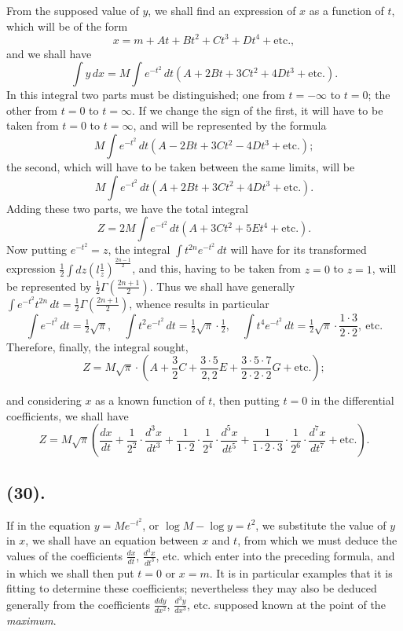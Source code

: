 \documentclass{article}
\begin{document}
From the supposed value of $y$, we shall find an expression of $x$ as a function of $t$, which will be of the form
\[ x=m+At+Bt^{2}+Ct^{3}+Dt^{4}+\text{etc.}, \]
and we shall have
\[ \int y\,dx=M\int e^{-t^{2}}\,dt(A+2Bt+3Ct^{2}+4Dt^{3}+\text{etc.}). \]
In this integral two parts must be distinguished; one from $t=-\infty$ to $t=0$; the other from $t=0$ to $t=\infty$. If we change the sign of the first, it will have to be taken from $t=0$ to $t=\infty$, and will be represented by the formula
\[ M\int e^{-t^{2}}\,dt(A-2Bt+3Ct^{2}-4Dt^{3}+\text{etc.}); \]
the second, which will have to be taken between the same limits, will be
\[ M\int e^{-t^{2}}\,dt(A+2Bt+3Ct^{2}+4Dt^{3}+\text{etc.}). \]
Adding these two parts, we have the total integral
\[ Z=2M\int e^{-t^{2}}\,dt(A+3Ct^{2}+5Et^{4}+\text{etc.}). \]
Now putting $e^{-t^{2}}=z$, the integral $\displaystyle\int t^{2n}e^{-t^{2}}\,dt$ will have for its transformed expression $\frac{1}{2}\displaystyle\int dz\left(l\frac{1}{z}\right)^{\frac{2n-1}{2}}$, and this, having to be taken from $z=0$ to $z=1$, will be represented by $\frac{1}{2}\Gamma\left(\frac{2n+1}{2}\right)$. Thus we shall have generally $\displaystyle\int e^{-t^{2}}t^{2n}\,dt=\frac{1}{2}\Gamma\left(\frac{2n+1}{2}\right)$, whence results in particular
\[ \int e^{-t^{2}}\,dt=\tfrac{1}{2}\sqrt{\pi},\quad \int t^{2}e^{-t^{2}}\,dt=\tfrac{1}{2}\sqrt{\pi}\cdot\tfrac{1}{2},\quad \int t^{4}e^{-t^{2}}\,dt=\tfrac{1}{2}\sqrt{\pi}\cdot\frac{1\cdot3}{2\cdot2},\ \text{etc.} \]
Therefore, finally, the integral sought,
\[ Z=M\sqrt{\pi}\cdot\left(A+\frac{3}{2}C+\frac{3\cdot5}{2,2}E+\frac{3\cdot5\cdot7}{2\cdot2\cdot2}G+\text{etc.}\right); \tag{1} \]

and considering $x$ as a known function of $t$, then putting $t=0$ in the differential coefficients, we shall have
\[ Z=M\sqrt{\pi}\left(\frac{dx}{dt}+\frac{1}{2^{2}}\cdot\frac{d^{3}x}{dt^{3}}+\frac{1}{1\cdot2}\cdot\frac{1}{2^{4}}\cdot\frac{d^{5}x}{dt^{5}}+\frac{1}{1\cdot2\cdot3}\cdot\frac{1}{2^{6}}\cdot\frac{d^{7}x}{dt^{7}}+\text{etc.}\right). \]

\subsection*{(30).}

If in the equation $y=Me^{-t^{2}}$, or $\log M-\log y=t^{2}$, we substitute the value of $y$ in $x$, we shall have an equation between $x$ and $t$, from which we must deduce the values of the coefficients $\frac{dx}{dt}$, $\frac{d^{3}x}{dt^{3}}$, etc. which enter into the preceding formula, and in which we shall then put $t=0$ or $x=m$. It is in particular examples that it is fitting to determine these coefficients; nevertheless they may also be deduced generally from the coefficients $\frac{ddy}{dx^{2}}$, $\frac{d^{3}y}{dx^{3}}$, etc. supposed known at the point of the \emph{maximum}.
\end{document}
